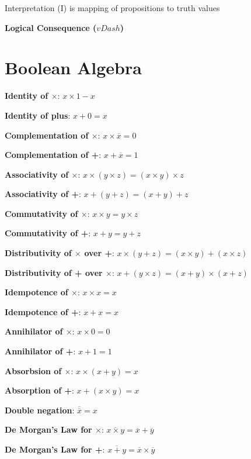 \documentclass[12pt]{article}
\begin{document}
\begin{spacing}{1.5}
\begin{itemize*}
	\item Interpretation (I) is mapping of propositions to truth values
		\begin{itemize*}
			\item \textbf{Logical Consequence ($vDash$)}
		\end{itemize*}
\end{itemize*} 


\section{Boolean Algebra}

\begin{itemize*}
	\item \textbf{Identity of $\times$}: $x \times 1 - x$
	\item \textbf{Identity of plus}: $x + 0 = x$
	\item \textbf{Complementation of $\times$}: $x \times \overline{x} = 0$
	\item \textbf{Complementation of +}: $x + \overline{x} = 1$
	\item \textbf{Associativity of $\times$}: $x \times (y \times z) = (x \times y) \times z$
	\item \textbf{Associativity of +}: $x + (y + z) = (x + y) + z$
	\item \textbf{Commutativity of $\times$}: $x \times y = y \times z$
	\item \textbf{Commutativity of +}: $x + y = y + z$
	\item \textbf{Distributivity of $\times$ over +}: $x \times (y + z) = (x \times y) + (x \times z)$
	\item \textbf{Distributivity of + over $\times$}: $x + (y \times z) = (x + y) \times (x + z)$
	\item \textbf{Idempotence of $\times$}: $x \times x = x$
	\item \textbf{Idempotence of +}: $x + x = x$
	\item \textbf{Annihilator of $\times$}: $x \times 0 = 0$
	\item \textbf{Annihilator of +}: $x + 1 = 1$
	\item \textbf{Absorbsion of $\times$}: $x \times (x + y) = x$
	\item \textbf{Absorption of +}: $x + (x \times y) = x$
	\item \textbf{Double negation}: $\overline{\overline{x}} = x$
	\item \textbf{De Morgan's Law for $\times$}: $\overline{x \times y} = \overline{x} + \overline{y}$
	\item \textbf{De Morgan's Law for +}: $\overline{x + y} = \overline{x} \times \overline{y}$
\end{itemize*}

\end{spacing}
\end{document}
